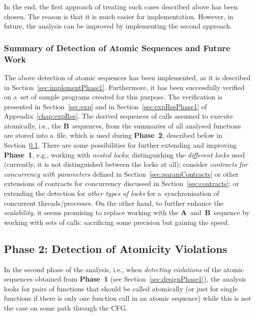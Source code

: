 In the end, the first approach of treating such cases described above has
been chosen. The reason is that it is much easier for implementation.
However, in future, the analysis can be improved by implementing the second
approach.

\subsubsection{Summary of Detection of Atomic Sequences and Future Work}

The above detection of atomic sequences has been implemented, as it is
described in Section~\ref{sec:implementPhase1}. Furthermore, it has
been successfully verified on a~set of sample programs created for
this purpose. The verification is presented in Section~\ref{sec:exp} and
in Section~\ref{sec:expResPhase1} of Appendix~\ref{chap:expRes}. The derived
sequences of calls assumed to execute atomically, i.e., the
\textbf{B}~sequences, from the summaries of all analysed functions are
stored into a~file, which is used during \textbf{Phase~2}, described
below in Section~\ref{sec:designPhase2}. There are some possibilities
for further extending and improving \textbf{Phase~1}, e.g., working with
\emph{nested locks}; distinguishing the \emph{different locks} used
(currently, it is not distinguished between the locks at all); consider
\emph{contracts for concurrency with parameters} defined in
Section~\ref{sec:paramContracts} or other extensions of
contracts for concurrency discussed in Section~\ref{sec:contracts}; or
extending the detection for \emph{other types of locks} for a~synchronisation
of concurrent threads/processes. On the other hand, to further enhance the
\emph{scalability}, it seems promising to replace working with the
\textbf{A}~and~\textbf{B}~sequence by working with sets of calls: sacrificing
some precision but gaining the speed.


\subsection{Phase 2: Detection of Atomicity Violations}
\label{sec:designPhase2}

In the second phase of the analysis, i.e., when \emph{detecting
violations} of the atomic sequences obtained from \textbf{Phase~1}
(see Section~\ref{sec:designPhase1}), the analysis looks for pairs of
functions that should be called atomically (or just for single functions
if there is only one function call in an atomic sequence) while this is
not the case on some path through the CFG.

